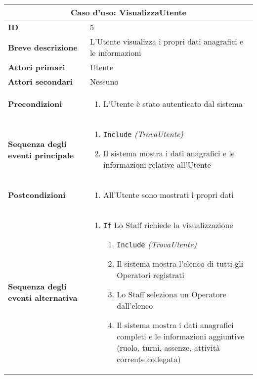 \documentclass[a4paper]{report}
\begin{document}
\clearpage
\begin{table}[H]
\vspace*{-0cm}
\renewcommand{\arraystretch}{1.9}
\begin{tabular}{|p{3.9cm}|p{9.9cm}|}
\hline
\multicolumn{2}{|c|}{\textbf{Caso d’uso: VisualizzaUtente}} \\ \hline
\textbf{ID} & 5 \\ \hline
\textbf{Breve descrizione} & L’Utente visualizza i propri dati anagrafici e le informazioni \\ \hline
\textbf{Attori primari} & Utente \\ \hline
\textbf{Attori secondari} & Nessuno \\ \hline
\textbf{Precondizioni} & \begin{enumerate}[leftmargin=14pt,label=\arabic*.,labelsep=0.5em,topsep=0pt,partopsep=0pt,parsep=0pt,itemsep=0pt]
    \item L’Utente è stato autenticato dal sistema
\end{enumerate} \\ \hline
\textbf{Sequenza degli eventi principale} &
\begin{enumerate}[leftmargin=14pt,label=\arabic*.,labelsep=0.5em,topsep=0pt,partopsep=0pt,parsep=0pt,itemsep=0pt]
    \item \texttt{Include} \textit{(TrovaUtente)} 
    \item Il sistema mostra i dati anagrafici  e le informazioni relative all’Utente
\end{enumerate}\\ \hline
\textbf{Postcondizioni} & \begin{enumerate}[leftmargin=14pt,label=\arabic*.,labelsep=0.5em,topsep=0pt,partopsep=0pt,parsep=0pt,itemsep=0pt]
    \item All’Utente sono mostrati i propri dati
    \end{enumerate} \\ \hline
\textbf{Sequenza degli eventi alternativa} & \begin{enumerate}[leftmargin=14pt,label=\arabic*.,labelsep=0.5em,topsep=0pt,partopsep=0pt,parsep=0pt,itemsep=0pt] 
    \item \texttt{If} Lo Staff richiede la visualizzazione
    \begin{enumerate}[label=\arabic{enumi}.\arabic*.,leftmargin=22pt,labelsep=0.5em,topsep=0pt,partopsep=0pt,parsep=0pt,itemsep=0pt]
        \item \texttt{Include} \textit{(TrovaUtente)} 
        \item Il sistema mostra l’elenco di tutti gli Operatori registrati
        \item Lo Staff seleziona un Operatore dall’elenco
        \item Il sistema mostra i dati anagrafici completi e le informazioni aggiuntive (ruolo, turni, assenze, attività corrente collegata)
    \end{enumerate}
\end{enumerate}\\ \hline
\end{tabular}
\end{table}
\end{document}
